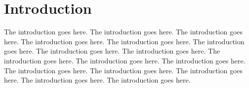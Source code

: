 \chapter{Introduction}
\label{section:intro}
The introduction goes here.
The introduction goes here.
The introduction goes here.
The introduction goes here.
The introduction goes here.
The introduction goes here.
The introduction goes here.
The introduction goes here.
The introduction goes here.
The introduction goes here.
The introduction goes here.
The introduction goes here.
The introduction goes here.
The introduction goes here.
The introduction goes here.
The introduction goes here.
